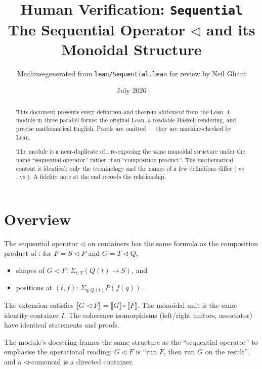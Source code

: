 \documentclass[11pt,a4paper]{article}
\title{Human Verification: \texttt{Sequential}\\[4pt]
  \large The Sequential Operator $\triangleleft$ and its Monoidal Structure}
\author{Machine-generated from \texttt{lean/Sequential.lean} for review by Neil Ghani}
\date{July 2026}
\begin{document}
\maketitle

\begin{abstract}
This document presents every definition and theorem \emph{statement} from the
Lean~4 module  in three parallel forms: the original Lean,
a readable Haskell rendering, and precise mathematical English.  Proofs are
omitted --- they are machine-checked by Lean.

The module is a near-duplicate of , re-exposing the
same monoidal structure under the name ``sequential operator'' rather than
``composition product''.  The mathematical content is identical; only the
terminology and the names of a few definitions differ (
vs ,  vs ).  A fidelity note
at the end records the relationship.
\end{abstract}

\tableofcontents
\bigskip

\section{Overview}

The sequential operator $\triangleleft$ on containers has the same formula as
the composition product of : for $F = S \triangleleft
P$ and $G = T \triangleleft Q$,
\begin{itemize}
  \item shapes of $G \triangleleft F$: $\Sigma_{t : T}(Q(t) \to S)$, and
  \item positions at $(t, f)$: $\Sigma_{q : Q(t)} P(f(q))$.
\end{itemize}
The extension satisfies $\llbracket G \triangleleft F \rrbracket = \llbracket
G \rrbracket \circ \llbracket F \rrbracket$.  The monoidal unit is the same
identity container $I$.  The coherence isomorphisms (left/right unitors,
associator) have identical statements and proofs.

The module's docstring frames the same structure as the ``sequential
operator'' to emphasise the operational reading: $G \triangleleft F$ is ``run
$F$, then run $G$ on the result'', and a $\triangleleft$-comonoid is a
directed container.
\end{document}
